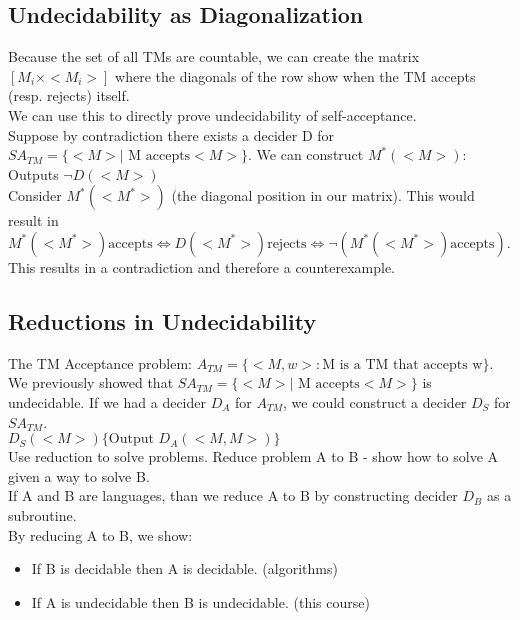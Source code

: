\subsection{Undecidability as Diagonalization}
Because the set of all TMs are countable, we can create the matrix $[M_i \times <M_i>]$ where the diagonals of the row show when the TM accepts (resp. rejects) itself.
\\
We can use this to directly prove undecidability of self-acceptance.
\\
Suppose by contradiction there exists a decider D for $SA_{TM} = \{<M> \vert \text{ M accepts} <M> \}$. We can construct $M^*(<M>)$: Outputs $\neg D(<M>)$
\\
Consider $M^*(<M^*>)$ (the diagonal position in our matrix). This would result in $M^*(<M^*>) \text{accepts} \iff D(<M^*>) \text{rejects} \iff \neg (M^*(<M^*>) \text{accepts})$. This results in a contradiction and therefore a counterexample.

\subsection{Reductions in Undecidability}
The TM Acceptance problem: $A_{TM} = \{<M,w> : \text{M is a TM that accepts w} \}$.
\\
We previously showed that $SA_{TM} = \{<M> \vert \text{ M accepts} <M> \}$ is undecidable. If we had a decider $D_A$ for $A_{TM}$, we could construct a decider $D_S$ for $SA_{TM}$. 
\\
$D_S(<M>) \{ \text{Output }D_A(<M , M>) \}$
\\
Use reduction to solve problems. Reduce problem A to B - show how to solve A given a way to solve B. 
\\
If A and B are languages, than we reduce A to B by constructing decider $D_B$ as a subroutine.
\\
By reducing A to B, we show:
\begin{itemize}
  \item If B is decidable then A is decidable. (algorithms)
  \item If A is undecidable then B is undecidable. (this course)
\end{itemize}

